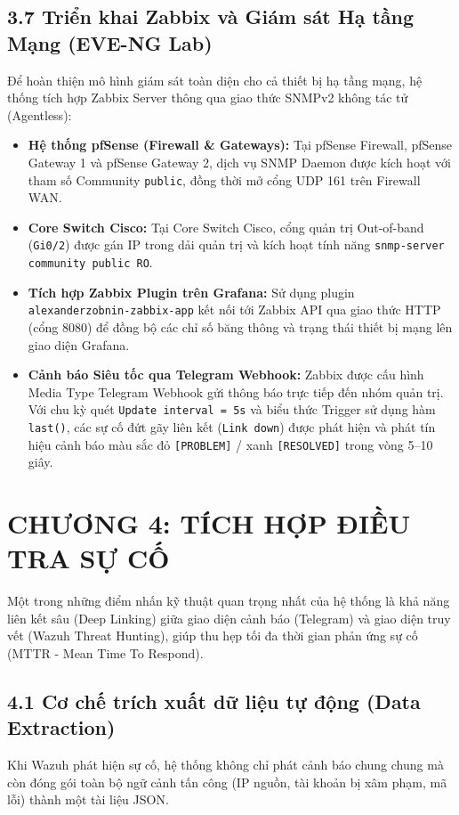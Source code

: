 \documentclass[13pt,a4paper]{extarticle}
\begin{document}
\subsection{3.7 Triển khai Zabbix và Giám sát Hạ tầng Mạng (EVE-NG Lab)}
Để hoàn thiện mô hình giám sát toàn diện cho cả thiết bị hạ tầng mạng, hệ thống tích hợp Zabbix Server thông qua giao thức SNMPv2 không tác tử (Agentless):
\begin{itemize}
    \item \textbf{Hệ thống pfSense (Firewall \& Gateways):} Tại pfSense Firewall, pfSense Gateway 1 và pfSense Gateway 2, dịch vụ SNMP Daemon được kích hoạt với tham số Community \texttt{public}, đồng thời mở cổng UDP 161 trên Firewall WAN.
    \item \textbf{Core Switch Cisco:} Tại Core Switch Cisco, cổng quản trị Out-of-band (\texttt{Gi0/2}) được gán IP trong dải quản trị và kích hoạt tính năng \texttt{snmp-server community public RO}.
    \item \textbf{Tích hợp Zabbix Plugin trên Grafana:} Sử dụng plugin \texttt{alexanderzobnin-zabbix-app} kết nối tới Zabbix API qua giao thức HTTP (cổng 8080) để đồng bộ các chỉ số băng thông và trạng thái thiết bị mạng lên giao diện Grafana.
    \item \textbf{Cảnh báo Siêu tốc qua Telegram Webhook:} Zabbix được cấu hình Media Type Telegram Webhook gửi thông báo trực tiếp đến nhóm quản trị. Với chu kỳ quét \texttt{Update interval = 5s} và biểu thức Trigger sử dụng hàm \texttt{last()}, các sự cố đứt gãy liên kết (\texttt{Link down}) được phát hiện và phát tín hiệu cảnh báo màu sắc đỏ \texttt{[PROBLEM]} / xanh \texttt{[RESOLVED]} trong vòng 5--10 giây.
\end{itemize}

\section{CHƯƠNG 4: TÍCH HỢP ĐIỀU TRA SỰ CỐ}
Một trong những điểm nhấn kỹ thuật quan trọng nhất của hệ thống là khả năng liên kết sâu (Deep Linking) giữa giao diện cảnh báo (Telegram) và giao diện truy vết (Wazuh Threat Hunting), giúp thu hẹp tối đa thời gian phản ứng sự cố (MTTR - Mean Time To Respond).

\subsection{4.1 Cơ chế trích xuất dữ liệu tự động (Data Extraction)}
Khi Wazuh phát hiện sự cố, hệ thống không chỉ phát cảnh báo chung chung mà còn đóng gói toàn bộ ngữ cảnh tấn công (IP nguồn, tài khoản bị xâm phạm, mã lỗi) thành một tài liệu JSON. 
\end{document}
